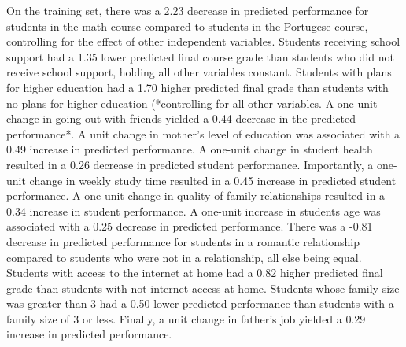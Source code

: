 \documentclass[sigconf]{acmart}
\begin{document}


On the training set, there was a 2.23 decrease in predicted performance 
for students in the math course compared to students in the Portugese course, 
controlling for the effect of other independent variables. Students receiving 
school support had a 1.35 lower predicted final course grade than students 
who did not receive school support, holding all other variables constant. 
Students with plans for higher education had a 1.70 higher predicted final 
grade than students with no plans for higher education (*controlling for 
all other variables. A one-unit change in going out with friends yielded 
a 0.44 decrease in the predicted performance*. A unit change in mother's 
level of education was associated with a 0.49 increase in predicted performance.
A one-unit change in student health resulted in a 0.26 decrease in predicted 
student performance. Importantly, a one-unit change in weekly study time 
resulted in a 0.45 increase in predicted student performance. A one-unit 
change in quality of family relationships resulted in a 0.34 increase in 
student performance. A one-unit increase in students age was associated with
a 0.25 decrease in predicted performance. There was a -0.81 decrease in 
predicted performance for students in a romantic relationship compared to 
students who were not in a relationship, all else being equal. Students with 
access to the internet at home had a 0.82 higher predicted final grade than 
students with not internet access at home. Students whose family size was
greater than 3 had a 0.50 lower predicted performance than students with 
a family size of 3 or less. Finally, a unit change in father's job yielded 
a 0.29 increase in predicted performance. 

\end{document}
